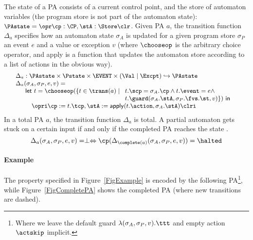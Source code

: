 The state of a PA consists of a current control point, and the store of
automaton variables (the program store is not part of the automaton state):
\({\small
\PAstate = \opr \cp : \CP, \stA : \Store \clr}
\). Given PA \(a\), the transition function \(\Delta_a\) specifies how
an automaton state \(\sigma_A\) is updated for a given program store
\(\sigma_P\) an event \(e\) and a value or exception \(v\) (where
\(\chooseop\) is the arbitrary choice operator, and \textsf{apply} is
a function that updates the automaton store according to a list of
actions in the obvious way).
\[{\small
\begin{array}{l}
\Delta_a  :  \PAstate \times \Pstate \times \EVENT \times (\Val \mid
\Excpt) \hookrightarrow
\PAstate\\
\Delta_a(\sigma_A, \sigma_P, e, v) = \\
\quad
\begin{array}[t]{l}
\mathsf{let\ }t = \chooseop(\{t\in \trans(a)\mid
  \begin{array}[t]{l}
     t.\scp = \sigma_A.\cp \wedge t.\event = e \wedge \\
     t.\guard(\sigma_A.\stA, \sigma_P.\fvs.\st, v)\}) \mathsf{\ in}
  \end{array}\\
\quad \opri \cp := t.\tcp, \stA := \mathsf{apply}(t.\action,
\sigma_A.\stA) \clri
\end{array}

\end{array}}
\]
In a total PA $a$, the transition function \(\Delta_a\) is total.
A partial automaton gets stuck on a certain input if and only if the
completed PA reaches the state \halted.
\vspace*{-.5em}
\begin{equation}\label{PAcompletionProp}
\Delta_a(\sigma_A, \sigma_P, e, v) = \perp \Leftrightarrow
\cp (\Delta_{\complete(a)}(\sigma_A, \sigma_P, e, v)) = \halted
\end{equation}


\paragraph{Example}
The property specified in Figure~\ref{FigExample} is encoded by the
following PA\footnote{Where we leave the default guard 
\(\lambda(\sigma_A, \sigma_P, v). \ttt\) and  empty action
\(\actskip\) implicit.}, while Figure~\ref{FigCompletePA} shows the
completed PA (where new transitions are dashed).

